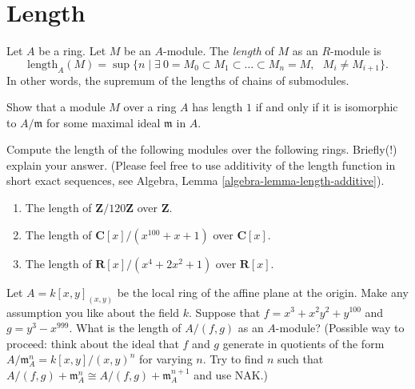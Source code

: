 \section{Length}
\label{section-length}

\begin{definition}
\label{definition-length}
Let $A$ be a ring. Let $M$ be an $A$-module. The
{\it length} of $M$ as an $R$-module is
$$
\text{length}_A(M)
=
\sup
\{
n
\mid
\exists\ 0 = M_0 \subset M_1 \subset \ldots \subset M_n = M,
\text{ }M_i \not = M_{i + 1}
\}.
$$
In other words, the supremum of the lengths of chains of submodules.
\end{definition}

\begin{exercise}
\label{exercise-length-is-one}
Show that a module $M$ over a ring $A$ has length $1$ if and only if
it is isomorphic to $A/\mathfrak m$ for some maximal ideal $\mathfrak m$
in $A$.
\end{exercise}

\begin{exercise}
\label{exercise-length-easy}
Compute the length of the following modules over the following rings.
Briefly(!) explain your answer. (Please feel free to use additivity of
the length function in short exact sequences, see
Algebra, Lemma \ref{algebra-lemma-length-additive}).
\begin{enumerate}
\item The length of $\mathbf{Z}/120\mathbf{Z}$ over $\mathbf{Z}$.
\item The length of $\mathbf{C}[x]/(x^{100} + x + 1)$ over $\mathbf{C}[x]$.
\item The length of $\mathbf{R}[x]/(x^4 + 2x^2 + 1)$ over $\mathbf{R}[x]$.
\end{enumerate}
\end{exercise}

\begin{exercise}
\label{exercise-compute-length}
Let $A = k[x, y]_{(x, y)}$ be the local ring of the affine plane at
the origin. Make any assumption you like about the field $k$. Suppose
that $f = x^3 + x^2y^2 + y^{100}$ and $g = y^3 - x^{999}$. What is the length
of $A/(f, g)$ as an $A$-module? (Possible way to proceed: think about the
ideal that $f$ and $g$ generate in quotients of the form $A/{\mathfrak m}_A^n=
k[x, y]/(x, y)^n$ for varying $n$. Try to find $n$ such that
$A/(f, g)+{\mathfrak m}_A^n \cong A/(f, g)+{\mathfrak m}_A^{n + 1}$
and use NAK.)
\end{exercise}



